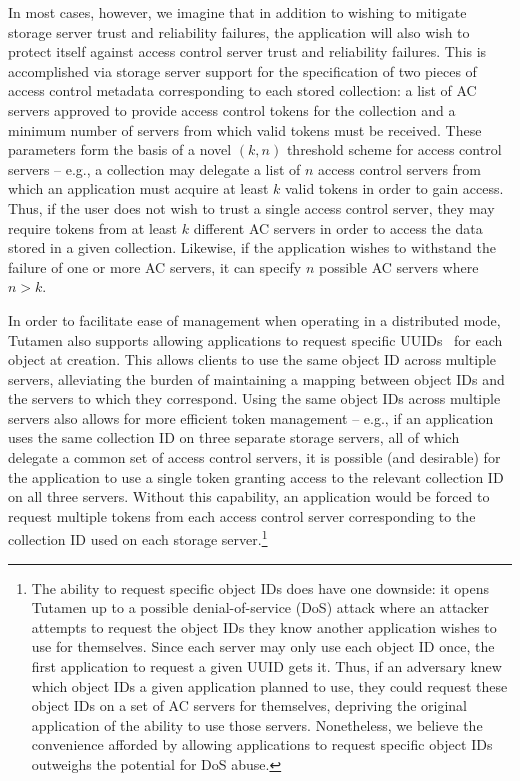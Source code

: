 In most cases, however, we imagine that in addition to wishing to
mitigate storage server trust and reliability failures, the
application will also wish to protect itself against access control
server trust and reliability failures. This is accomplished via
storage server support for the specification of two pieces of access
control metadata corresponding to each stored collection: a list of AC
servers approved to provide access control tokens for the collection
and a minimum number of servers from which valid tokens must be
received. These parameters form the basis of a novel $(k, n)$
threshold scheme for access control servers -- e.g., a collection may
delegate a list of $n$ access control servers from which an
application must acquire at least $k$ valid tokens in order to gain
access. Thus, if the user does not wish to trust a single access
control server, they may require tokens from at least $k$ different AC
servers in order to access the data stored in a given
collection. Likewise, if the application wishes to withstand the
failure of one or more AC servers, it can specify $n$ possible AC
servers where $n > k$.

In order to facilitate ease of management when operating in a
distributed mode, Tutamen also supports allowing applications to
request specific UUIDs~\cite{leach2005} for each object at creation.
This allows clients to use the same object ID across multiple servers,
alleviating the burden of maintaining a mapping between object IDs and
the servers to which they correspond. Using the same object IDs across
multiple servers also allows for more efficient token management --
e.g., if an application uses the same collection ID on three separate
storage servers, all of which delegate a common set of access control
servers, it is possible (and desirable) for the application to use a
single token granting access to the relevant collection ID on all
three servers. Without this capability, an application would be forced
to request multiple tokens from each access control server
corresponding to the collection ID used on each storage
server.\footnote{The ability to request specific object IDs does have
  one downside: it opens Tutamen up to a possible denial-of-service
  (DoS) attack where an attacker attempts to request the object IDs
  they know another application wishes to use for themselves. Since
  each server may only use each object ID once, the first application
  to request a given UUID gets it. Thus, if an adversary knew which
  object IDs a given application planned to use, they could request
  these object IDs on a set of AC servers for themselves, depriving
  the original application of the ability to use those
  servers. Nonetheless, we believe the convenience afforded by
  allowing applications to request specific object IDs outweighs the
  potential for DoS abuse.}


